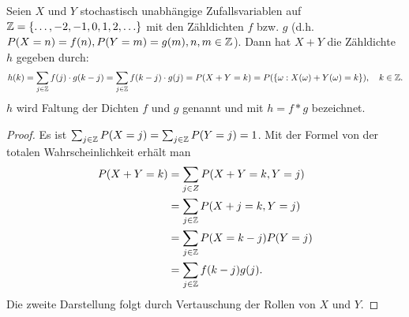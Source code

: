 \documentclass{lecture}
\begin{document}
    \begin{theorem}
        Seien \(X\) und \(Y\) stochastisch unabhängige Zufallsvariablen auf \(\Z = \braces*{\ldots, -2, -1, 0, 1, 2, \ldots}\) mit den Zähldichten \(f\) bzw. \(g\) (d.h. \(P\parentheses*{X = n} = f\parentheses*{n}, P\parentheses*{Y = m} = g\parentheses*{m}, n, m \in \Z\)).
        Dann hat \(X + Y\) die Zähldichte \(h\) gegeben durch:
        \[
            h\parentheses*{k} = \sum_{j \in \Z}f\parentheses*{j} \cdot g\parentheses*{k - j} = \sum_{j \in \Z}f\parentheses*{k - j} \cdot g\parentheses*{j} = P\parentheses*{X + Y = k} = P\parentheses*{\braces*{\omega : X\parentheses*{\omega} + Y\parentheses*{\omega} = k}}, \quad k \in \Z.
        \]
        \(h\) wird Faltung der Dichten \(f\) und \(g\) genannt und mit \(h = f * g\) bezeichnet.
    \end{theorem}

    \begin{proof}
        Es ist \(\sum_{j \in \Z}P\parentheses*{X = j} = \sum_{j \in \Z}P\parentheses*{Y = j} = 1\).
        Mit der Formel von der totalen Wahrscheinlichkeit erhält man
        \begin{align*}
            P\parentheses*{X + Y = k} &= \sum_{j \in Z}P\parentheses*{X + Y = k, Y = j}\\
            &= \sum_{j \in \Z}P\parentheses*{X + j = k, Y = j}\\
            &= \sum_{j \in \Z}P\parentheses*{X = k - j}P\parentheses*{Y = j}\\
            &= \sum_{j \in \Z}f\parentheses*{k - j}g\parentheses*{j}.
        \end{align*}
        Die zweite Darstellung folgt durch Vertauschung der Rollen von \(X\) und \(Y\).
    \end{proof}
\end{document}
